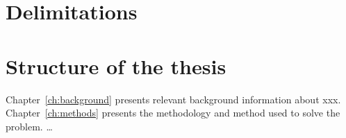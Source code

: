 \section{Delimitations} %

\section{Structure of the thesis} %
Chapter~\ref{ch:background} presents relevant background information about xxx.  Chapter~\ref{ch:methods} presents the methodology and method used to solve the problem. …